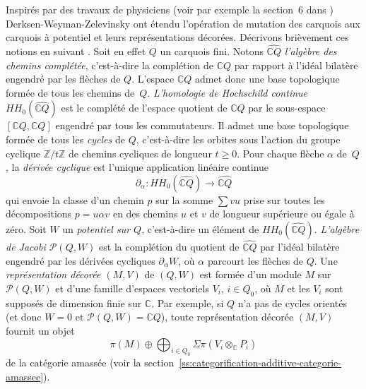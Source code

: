 \documentclass[brochure,12pt]{bourbaki}
\numberwithin{equation}{subsection}
\numberwithin{theorem}{section}
\newcommand{\Z}{\mathbb{Z}}
\newcommand{\C}{\mathbb{C}}
\newcommand{\ten}{\otimes}
\newcommand{\cp}{{\mathcal P}}
\renewcommand{\hat}[1]{\widehat{#1}}
\newcommand{\HH}{HH}
\begin{document}
Inspir\'es par des travaux de physiciens (voir par exemple
la section~6 dans \cite{FengHananyHeUranga01}) Derksen-Weyman-Zelevinsky
ont \'etendu \cite{DerksenWeymanZelevinsky08} l'op\'eration
de mutation des carquois aux carquois \`a potentiel
et leurs repr\'esentations d\'ecor\'ees. D\'ecrivons
bri\`evement ces notions en suivant \cite{DerksenWeymanZelevinsky08}.
Soit en effet $Q$ un carquois fini. Notons $\hat{\C Q}$ {\em l'alg\`ebre
des chemins compl\'et\'ee}, c'est-\`a-dire la compl\'etion
de $\C Q$ par rapport \`a l'id\'eal bilat\`ere engendr\'e
par les fl\`eches de $Q$. L'espace $\C Q$ admet donc
une base topologique form\'ee de tous les chemins de~$Q$.
{\em L'homologie de Hochschild continue $\HH_0(\widehat{\C Q})$}
est le compl\'et\'e de l'espace quotient de $\C Q$ par
le sous-espace $[\C Q, \C Q]$ engendr\'e par tous les
commutateurs. Il admet une base topologique form\'ee
de tous les {\em cycles} de $Q$, c'est-\`a-dire les
orbites sous l'action du groupe cyclique $\Z/t\Z$
de chemins cycliques de longueur $t\geq 0$. Pour
chaque fl\`eche $\alpha$ de~$Q$, la {\em d\'eriv\'ee
cyclique} \cite{RotaSaganStein80}
est l'unique application lin\'eaire continue
\[
\partial_\alpha: \HH_0(\widehat{\C Q}) \to \widehat{\C Q}
\]
qui envoie la classe d'un chemin $p$ sur la somme $\sum vu$
prise sur toutes les d\'ecompositions $p=u\alpha v$
en des chemins $u$ et $v$ de longueur sup\'erieure ou \'egale
\`a z\'ero. Soit $W$ un {\em potentiel sur $Q$}, c'est-\`a-dire
un \'el\'ement de $\HH_0(\widehat{\C Q})$. {\em L'alg\`ebre
de Jacobi $\cp(Q,W)$} est la compl\'etion du quotient
de $\widehat{\C Q}$ par l'id\'eal bilat\`ere engendr\'e par
les d\'eriv\'ees cycliques $\partial_\alpha W$, o\`u $\alpha$
parcourt les fl\`eches de $Q$. Une {\em repr\'esentation d\'ecor\'ee
$(M,V)$} de $(Q,W)$ est form\'ee d'un module $M$ sur
$\cp(Q,W)$ et d'une famille d'espaces vectoriels $V_i$,
$i\in Q_0$, o\`u $M$ et les $V_i$ sont suppos\'es de dimension
finie sur $\C$. Par exemple, si $Q$ n'a pas de cycles
orient\'es (et donc $W=0$ et $\cp(Q,W)=\C Q$), toute
repr\'esentation d\'ecor\'ee $(M,V)$ fournit un
objet
\[
\pi(M)\oplus \bigoplus_{i\in Q_0} \Sigma \pi(V_i\ten_\C P_i)
\]
de la cat\'egorie amass\'ee (voir la section~\ref{ss:categorification-additive-categorie-amassee}).
\end{document}
